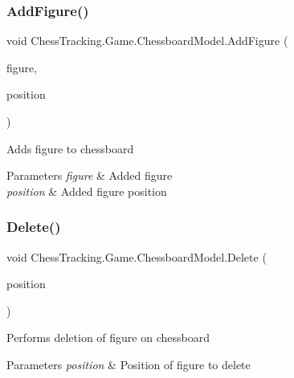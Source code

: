 \subsubsection{\texorpdfstring{AddFigure()}{AddFigure()}}
{\footnotesize\ttfamily void Chess\+Tracking.\+Game.\+Chessboard\+Model.\+Add\+Figure (\begin{DoxyParamCaption}\item[{\mbox{\hyperlink{class_chess_tracking_1_1_game_1_1_figure}{Figure}}}]{figure,  }\item[{\mbox{\hyperlink{class_chess_tracking_1_1_game_1_1_chess_position}{Chess\+Position}}}]{position }\end{DoxyParamCaption})}



Adds figure to chessboard 


\begin{DoxyParams}{Parameters}
{\em figure} & Added figure\\
\hline
{\em position} & Added figure position\\
\hline
\end{DoxyParams}
\mbox{\label{class_chess_tracking_1_1_game_1_1_chessboard_model_a81d023f3491a9d0c41ac971c8ac5b86d}} 
\subsubsection{\texorpdfstring{Delete()}{Delete()}}
{\footnotesize\ttfamily void Chess\+Tracking.\+Game.\+Chessboard\+Model.\+Delete (\begin{DoxyParamCaption}\item[{\mbox{\hyperlink{class_chess_tracking_1_1_game_1_1_chess_position}{Chess\+Position}}}]{position }\end{DoxyParamCaption})}



Performs deletion of figure on chessboard 


\begin{DoxyParams}{Parameters}
{\em position} & Position of figure to delete\\
\hline
\end{DoxyParams}
\mbox{\label{class_chess_tracking_1_1_game_1_1_chessboard_model_a0a6ca632d187edbe633a18c21d210365}} 
